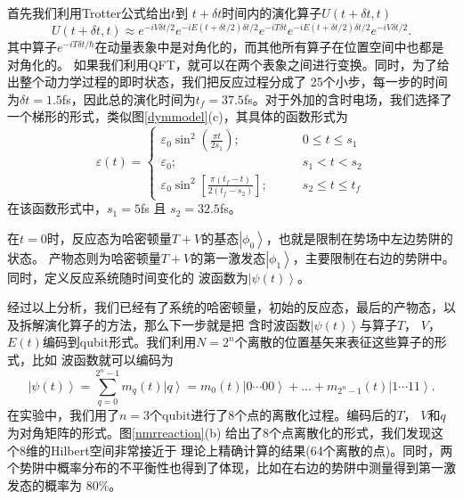  首先我们利用Trotter公式给出$t$到 $t+\delta t$时间内的演化算子$ {U}(t+\delta t,t)$
 \begin{equation}
 {U}(t+\delta t,t)\approx  e^{-i {V} \delta t/2} e^{-i {E} (t+\delta t/2)  \delta t/2}
 e^{-i {T} \delta t}    e^{-i {E} (t+\delta t/2)           \delta t/2}
 e^{-i {V} \delta t/2} .
\end{equation}
其中算子$e^{-i {T}\delta t/\hbar}$在动量表象中是对角化的，而其他所有算子在位置空间中也都是对角化的。
如果我们利用QFT，就可以在两个表象之间进行变换。同时，为了给出整个动力学过程的即时状态，我们把反应过程分成了
25个小步，每一步的时间为$\delta t=1.5$fs，因此总的演化时间为$t_f=37.5$fs。对于外加的含时电场，我们选择了一个梯形的形式，类似图\ref{dymmodel}(c)，其具体的函数形式为
 \begin{equation}
  \varepsilon(t)=\left\{
    \begin{array}{cc}
       \varepsilon_0\sin^2(\frac{\pi t}     {2s_1})         ;&\qquad   0\leq t\leq s_1\\
       \varepsilon_0                                        ;&\qquad   s_1<t<s_2\\
       \varepsilon_0\sin^2[\frac{\pi(t_f-t)}{2(t_f-s_2)}]   ;&\qquad   s_2\leq t\leq t_f
    \end{array}
  \right.
\end{equation}
在该函数形式中，$s_1=5$fs 且 $s_2=32.5$fs。

在$t=0$时，反应态为哈密顿量$T+V$的基态$\left\vert \phi_{0} \right\rangle$，也就是限制在势场中左边势阱的状态。
产物态则为哈密顿量$T+V$的第一激发态$\left\vert \phi_{1} \right\rangle$，主要限制在右边的势阱中。同时，定义反应系统随时间变化的
波函数为$\left\vert \psi({t}) \right\rangle$。

经过以上分析，我们已经有了系统的哈密顿量，初始的反应态，最后的产物态，以及拆解演化算子的方法，那么下一步就是把
含时波函数$\left\vert \psi({t}) \right\rangle$与算子$T$， $V$， $E(t)$编码到qubit形式。我们利用$N=2^n$个离散的位置基矢来表征这些算子的形式，比如
波函数就可以编码为
\begin{equation}
\left\vert \psi(t) \right\rangle=\sum_{q=0}^{2^n-1}m_q(t)\left\vert q \right\rangle
=m_0(t)\left\vert 0\cdots00 \right\rangle+...+m_{2^n-1}(t)\left\vert 1\cdots11 \right\rangle.
\end{equation}
在实验中，我们用了$n=3$个qubit进行了8个点的离散化过程。编码后的$T$， $V$和$q$为对角矩阵的形式。图\ref{nmrreaction}(b) 给出了8个点离散化的形式，我们发现这个8维的Hilbert空间非常接近于
理论上精确计算的结果(64个离散的点)。同时，两个势阱中概率分布的不平衡性也得到了体现，比如在右边的势阱中测量得到第一激发态的概率为
$80\%$。

